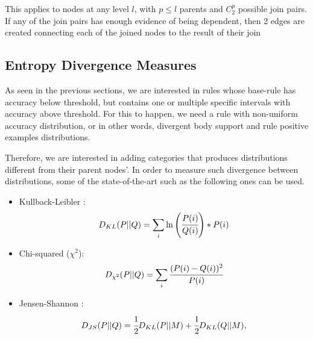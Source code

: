 \begin{comment}
In level 1 from \graphname, nodes can be directly pruned, on the other hand, for further levels, for a node to be
pruned by independence, all the possible joins resulting the node must be independent. In level 2, for example, in
order
to prune the node $r a_1 b_1 c_1$, given that in level 1 the nodes $r a_1 b_1$, $r a_1 c_1$ and $r b_1 c_1$ were not
pruned. All the three possible join combinations should fail the independence test, i.e.:

\begin{equation}
\begin{split} 
  freq(r a_1 b_1 c_1) &\approx freq(r a_1)p (r b_1|r a_1) p(r c_1|r a_1) \\ 
  &\approx  freq(r b_1) p(r a_1|r b_1) p(r c_1|r b_1) \\ 
  &\approx  freq(r c_1) p(r a_1|r c_1) p(r b_1|r c_1)  
\end{split}
\end{equation}
\end{comment}

This applies to nodes at any level $l$, with $p \leq l$ parents and $C_{2}^{p}$ possible join pairs. If any of the
join
pairs has enough evidence of being dependent, then 2 edges are created connecting each of the joined
nodes to the result of their join

\subsection{Entropy Divergence Measures}

As seen in the previous sections, we are interested in rules whose base-rule has accuracy below threshold, but
contains
one or multiple specific intervals with accuracy above threshold. For this to happen, we need a rule with non-uniform
accuracy distribution, or in other words, divergent body support and rule positive examples distributions.

Therefore, we are interested in adding categories that produces distributions different from their parent nodes'. In
order to measure such divergence between distributions, some of the state-of-the-art such as the following ones can be
used.

\begin{itemize}
 \item Kullback-Leibler \cite{Kullback51klDivergence}: 
    \begin{equation}
      D_{KL}(P||Q)=\sum_{\substack{i}}\ln\left(\cfrac{P(i)}{Q(i)}\right)*P(i)
    \end{equation}
 \item Chi-squared ($\chi^2$):
    \begin{equation}
      D_{\chi^2}(P||Q)=\sum_{\substack{i}}\cfrac{(P(i)-Q(i))^2}{P(i)}
    \end{equation}
 \item Jensen-Shannon \cite{17795}:
    \begin{equation}
      D_{JS}(P||Q)=\cfrac{1}{2}D_{KL}(P||M)+\cfrac{1}{2}D_{KL}(Q||M), 
    \end{equation}
\end{itemize}


